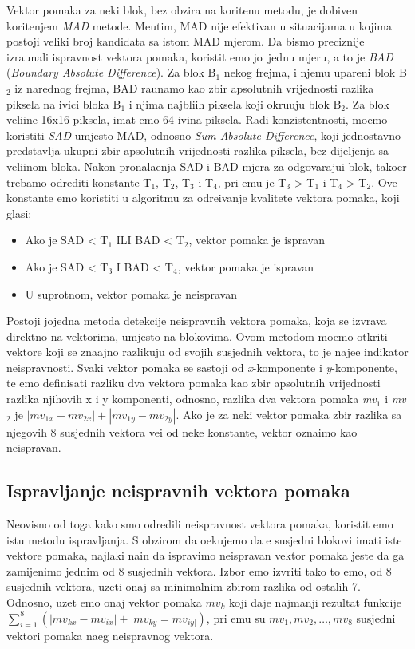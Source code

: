 Vektor pomaka za neki blok, bez obzira na kori\sh tenu metodu, je dobiven kori\sh tenjem \textit{MAD} metode. Me\dj utim, MAD nije efektivan u situacijama u kojima postoji veliki broj kandidata sa istom MAD mjerom.
Da bismo preciznije izra\ch unali ispravnost vektora pomaka, koristit \cj emo jo\sh\ jednu mjeru, a to je \textit{BAD} (\textit{Boundary Absolute Difference}). Za blok B$_1$ nekog frejma, i njemu upareni blok B$_2$ iz narednog
frejma, BAD ra\ch unamo kao zbir apsolutnih vrijednosti razlika piksela na ivici bloka B$_1$ i njima najbli\zh ih piksela koji okru\zh uju blok B$_2$. %
Za blok veli\ch ine 16x16 piksela, imat \cj emo 64 ivi\ch na piksela. Radi konzistentnosti, mo\zh emo koristiti \textit{SAD} umjesto MAD, odnosno \textit{Sum Absolute Difference}, koji jednostavno predstavlja ukupni zbir
apsolutnih vrijednosti razlika piksela, bez dijeljenja sa veli\ch inom bloka. Nakon pronala\zh enja SAD i BAD mjera za odgovaraju\cj i blok, tako\dj er trebamo odrediti konstante T$_1$, T$_2$, T$_3$ i T$_4$, pri \ch emu je T$_3$ > T$_1$ i T$_4$ > T$_2$. 
Ove konstante \cj emo koristiti u algoritmu za odre\dj ivanje kvalitete vektora pomaka, koji glasi:
\begin{itemize}
	\item Ako je SAD < T$_1$ ILI BAD < T$_2$, vektor pomaka je ispravan
	\item Ako je SAD < T$_3$ I BAD < T$_4$, vektor pomaka je ispravan
	\item U suprotnom, vektor pomaka je neispravan
\end{itemize}

Postoji jo\sh jedna metoda detekcije neispravnih vektora pomaka, koja se izvr\sh ava direktno na vektorima, umjesto na blokovima. Ovom metodom mo\zh emo otkriti vektore koji se zna\ch ajno razlikuju od svojih susjednih vektora,
\sh to je naj\ch e\sh \cj e indikator neispravnosti. Svaki vektor pomaka se sastoji od \textit{x}-komponente i \textit{y}-komponente, te \cj emo definisati razliku dva vektora pomaka kao zbir apsolutnih vrijednosti razlika njihovih
x i y komponenti, odnosno, razlika dva vektora pomaka \textit{mv$_1$} i \textit{mv$_2$} je $|mv_{1x} - mv_{2x}| + |mv_{1y} - mv_{2y}|$. Ako je za neki vektor pomaka zbir razlika sa njegovih 8 susjednih vektora ve\cj i od neke
konstante, vektor ozna\ch imo kao neispravan.

\subsection{Ispravljanje neispravnih vektora pomaka}
Neovisno od toga kako smo odredili neispravnost vektora pomaka, koristit \cj emo istu metodu ispravljanja. S obzirom da o\ch ekujemo da \cj e susjedni blokovi imati iste vektore pomaka, najlak\sh i na\ch in da ispravimo neispravan 
vektor pomaka jeste da ga zamijenimo jednim od 8 susjednih vektora. Izbor \cj emo izvr\sh iti tako \sh to \cj emo, od 8 susjednih vektora, uzeti onaj sa minimalnim zbirom razlika od ostalih 7. Odnosno, uzet \cj emo onaj vektor pomaka
$mv_k$ koji daje najmanji rezultat funkcije $\sum_{i=1}^{8}(|mv_{kx}-mv_{ix}|+|mv_{ky}=mv_{iy|})$, pri \ch emu su $mv_1, mv_2, \ldots , mv_8$ susjedni vektori pomaka na\sh eg neispravnog vektora.

